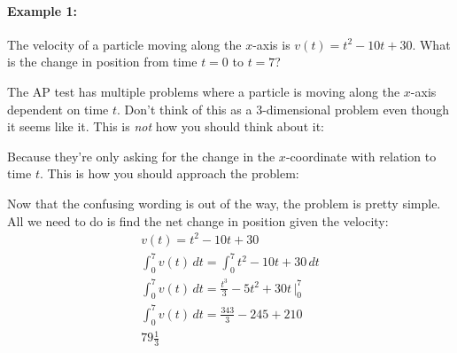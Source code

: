 \documentclass[../revisedmain.tex]{subfiles}
\begin{document}
\paragraph{Example 1:}The velocity of a particle moving along the $x$-axis is $v(t)=t^2-10t+30$. What is the change in position from time $t=0$ to $t=7$?\\\newline\par The AP test has multiple problems where a particle is moving along the $x$-axis dependent on time $t$. Don't think of this as a 3-dimensional problem even though it seems like it. This is \textit{not} how you should think about it:\\\vspace{.125in}
\begin{center}
\end{center}
Because they're only asking for the change in the $x$-coordinate with relation to time $t$. This is how you should approach the problem:
\begin{center}
\end{center}
Now that the confusing wording is out of the way, the problem is pretty simple. All we need to do is find the net change in position given the velocity:
\begin{gather*}
	v(t)=t^2-10t+30\\
	\int_{0}^{7}v(t)\,dt=\int_{0}^{7}t^2-10t+30\,dt\\
	\int_{0}^{7}v(t)\,dt=\frac{t^3}{3}-5t^2+30t\,\Big|_{0}^{7}\\
	\int_{0}^{7}v(t)\,dt=\frac{343}{3}-245+210\\
	79\frac{1}{3}
\end{gather*}
\end{document}
